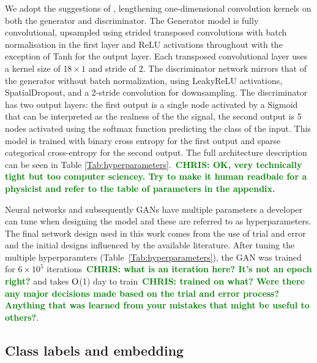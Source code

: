 \documentclass[12pt]{iopart}
\newcommand{\chris}[1]{\textbf{\textcolor{green}{CHRIS: #1}}}
\begin{document}
%
We adopt the suggestions of \cite{Radford2015,DBLP:journals/corr/abs-1809-11096}, lengthening
one-dimensional convolution kernels on both the generator and discriminator.
The Generator model is fully convolutional, upsampled using strided transposed
convolutions with batch normalisation in the first layer and ReLU activations
throughout with the exception of Tanh for the output layer. Each transposed
convolutional layer uses a kernel size of $18\times 1$ and stride of 2. The
discriminator network mirrors that of the generator without batch
normalization, using LeakyReLU activations, SpatialDropout, and a 2-stride
convolution for downsampling. The discriminator has two output layers: the
first output is a single node activated by a Sigmoid that can be interpreted as
the realness of the the signal, the second output is 5 nodes activated using
the softmax function predicting the class of the input.  This model is trained
with binary cross entropy for the first output and sparse categorical
cross-entropy for the second output. The full architecture description can be seen in Table \ref{Tab:hyperparameters}.~\chris{OK, very technically tight but too
computer sciencey. Try to make it human readbale for a physicist and refer to
the table of parameters in the appendix.}

%
Neural networks and subsequently \acp{GAN} have multiple parameters a developer
can tune when designing the model and these are referred to as hyperparameters.
The final network design used in this work comes from the use of trial and
error and the initial designs influenced by the available literature. After
tuning the multiple hyperparamters (Table~\ref{Tab:hyperparameters}), the GAN
was trained for $6\times 10^5$ iterations~\chris{what is an iteration here?
It's not an epoch right?} and takes $\mathord{\mathrm{O}}$(1) day to train~\chris{trained on
what? Were there any major decisions made based on the trial and error process?
Anything that was learned from your mistakes that might be useful to others?}.

\subsection{Class labels and embedding}
\end{document}
